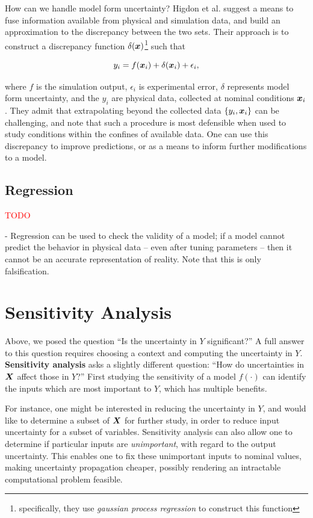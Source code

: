 \documentclass[../primer.tex]{subfiles}
\begin{document}
How can we handle model form uncertainty? Higdon et
al.\cite{higdon2004calibration-prediction} suggest a means to fuse information
available from physical and simulation data, and build an approximation to the
discrepancy between the two sets. Their approach is to construct a discrepancy
function $\delta(\boldsymbol{x})$\footnote{specifically, they use \emph{gaussian process
    regression} to construct this function} such that

\begin{equation}
  y_i = f(\boldsymbol{x}_i) + \delta(\boldsymbol{x}_i) + \epsilon_i,
\end{equation}

\noindent where $f$ is the simulation output, $\epsilon_i$ is experimental
error, $\delta$ represents model form uncertainty, and the $y_i$ are physical
data, collected at nominal conditions $\boldsymbol{x}_i$. They admit that extrapolating
beyond the collected data $\{y_i,\boldsymbol{x}_i\}$ can be challenging, and note that such
a procedure is most defensible when used to study conditions within the confines
of available data. One can use this discrepancy to improve predictions, or as a
means to inform further modifications to a model.\cite{joseph2015engineering}

\subsection{Regression}
\textcolor{red}{TODO}

- Regression can be used to check the validity of a model; if a model cannot
predict the behavior in physical data -- even after tuning parameters -- then it
cannot be an accurate representation of reality. Note that this is only
falsification.

\section{Sensitivity Analysis}
Above, we posed the question ``Is the uncertainty in $Y$ significant?'' A full
answer to this question requires choosing a context and computing the
uncertainty in $Y$. \textbf{Sensitivity analysis} asks a slightly different
question: ``How do uncertainties in $\boldsymbol{X}$ affect those in $Y$?'' First studying
the sensitivity of a model $f(\cdot)$ can identify the inputs which are most
important to $Y$, which has multiple benefits.

For instance, one might be interested in reducing the uncertainty in $Y$, and
would like to determine a subset of $\boldsymbol{X}$ for further study, in order to reduce
input uncertainty for a subset of variables. Sensitivity analysis can also allow
one to determine if particular inputs are \emph{unimportant}, with regard to the
output uncertainty. This enables one to fix these unimportant inputs to nominal
values, making uncertainty propagation cheaper, possibly rendering an
intractable computational problem feasible.
\end{document}
